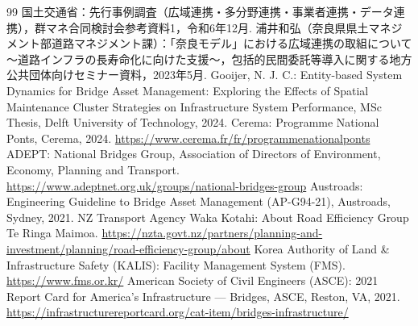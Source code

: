 \documentclass[Journal,letterpaper,InsideFigs,NoLineNumbers]{ascelike-new}
\begin{document}
\begin{thebibliography}{99}
国土交通省：先行事例調査（広域連携・多分野連携・事業者連携・データ連携），群マネ合同検討会参考資料1，令和6年12月.
浦井和弘（奈良県県土マネジメント部道路マネジメント課）：「奈良モデル」における広域連携の取組について～道路インフラの長寿命化に向けた支援～，包括的民間委託等導入に関する地方公共団体向けセミナー資料，2023年5月.
Gooijer, N. J. C.: Entity-based System Dynamics for Bridge Asset Management: Exploring the Effects of Spatial Maintenance Cluster Strategies on Infrastructure System Performance, MSc Thesis, Delft University of Technology, 2024.
Cerema: Programme National Ponts, Cerema, 2024. \url{https://www.cerema.fr/fr/programmenationalponts}
ADEPT: National Bridges Group, Association of Directors of Environment, Economy, Planning and Transport. \url{https://www.adeptnet.org.uk/groups/national-bridges-group}
Austroads: Engineering Guideline to Bridge Asset Management (AP-G94-21), Austroads, Sydney, 2021.
NZ Transport Agency Waka Kotahi: About Road Efficiency Group Te Ringa Maimoa. \url{https://nzta.govt.nz/partners/planning-and-investment/planning/road-efficiency-group/about}
Korea Authority of Land \& Infrastructure Safety (KALIS): Facility Management System (FMS). \url{https://www.fms.or.kr/}
American Society of Civil Engineers (ASCE): 2021 Report Card for America's Infrastructure --- Bridges, ASCE, Reston, VA, 2021. \url{https://infrastructurereportcard.org/cat-item/bridges-infrastructure/}
\end{thebibliography}
\end{document}
